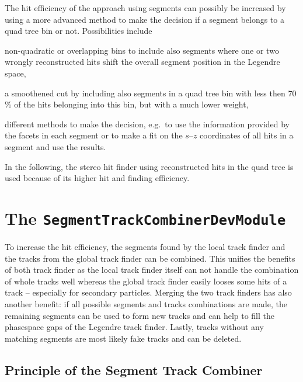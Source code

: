 The hit efficiency of the approach using segments can possibly be increased by using a more advanced method to make the decision if a segment belongs to a quad tree bin or not. Possibilities include 
\begin{zlist}
 \item non-quadratic or overlapping bins to include also segments where one or two wrongly reconstructed hits shift the overall segment position in the Legendre space,
 \item a smoothened cut by including also segments in a quad tree bin with less then 70 \% of the hits belonging into this bin, but with a much lower weight,
 \item different methods to make the decision, e.g.\ to use the information provided by the facets in each segment or to make a fit on the $s$--$z$ coordinates of all hits in a segment and use the results.
\end{zlist}

In the following, the stereo hit finder using reconstructed hits in the quad tree is used because of its higher hit and finding efficiency.

\section{The \texttt{SegmentTrackCombinerDevModule}} \label{section-combiner}

To increase the hit efficiency, the segments found by the local track finder and the tracks from the global track finder can be combined. This unifies the benefits of both track finder as the local track finder itself can not handle the combination of whole tracks well whereas the global track finder easily looses some hits of a track -- especially for secondary particles. Merging the two track finders has also another benefit: if all possible segments and tracks combinations are made, the remaining segments can be used to form new tracks and can help to fill the phasespace gaps of the Legendre track finder. Lastly, tracks without any matching segments are most likely fake tracks and can be deleted. 

\subsection{Principle of the Segment Track Combiner}

